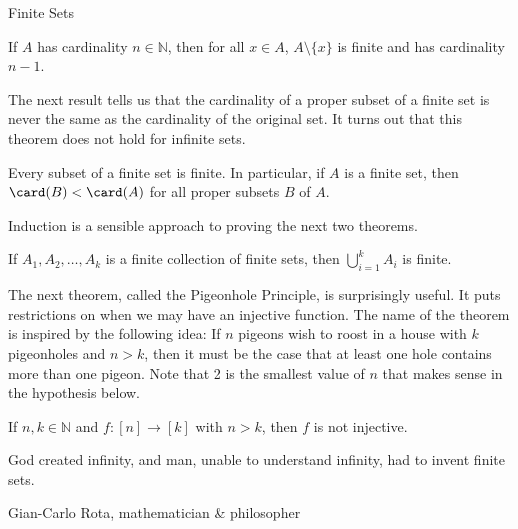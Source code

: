 \begin{section}{Finite Sets}
\begin{theorem}\label{thm:decreaseCardinality}
If $A$ has cardinality $n\in\mathbb{N}$, then for all $x\in A$, $A\setminus \{x\}$ is finite and has cardinality $n-1$. 
\end{theorem}

The next result tells us that the cardinality of a proper subset of a finite set is never the same as the cardinality of the original set.  It turns out that this theorem does not hold for infinite sets. 

\begin{theorem}\label{thm:cardinalityProperSubsetsFinite}
Every subset of a finite set is finite. In particular, if $A$ is a finite set, then $\card(B)<\card(A)$ for all proper subsets $B$ of $A$.
\end{theorem}

Induction is a sensible approach to proving the next two theorems.

\begin{theorem}
If $A_1,A_2,\ldots, A_k$ is a finite collection of finite sets, then $\displaystyle \bigcup_{i=1}^k A_i$ is finite.
\end{theorem}

The next theorem, called the Pigeonhole Principle, is surprisingly useful. It puts restrictions on when we may have an injective function. The name of the theorem is inspired by the following idea: If $n$ pigeons wish to roost in a house with $k$ pigeonholes and $n>k$, then it must be the case that at least one hole contains more than one pigeon.  Note that 2 is the smallest value of $n$ that makes sense in the hypothesis below.

\begin{theorem}
If $n,k\in\mathbb{N}$ and $f:[n]\to [k]$ with $n>k$, then $f$ is not injective.
\end{theorem}

\epigraph{God created infinity, and man, unable to understand infinity, had to invent finite sets.}{Gian-Carlo Rota, mathematician \& philosopher}

\end{section}